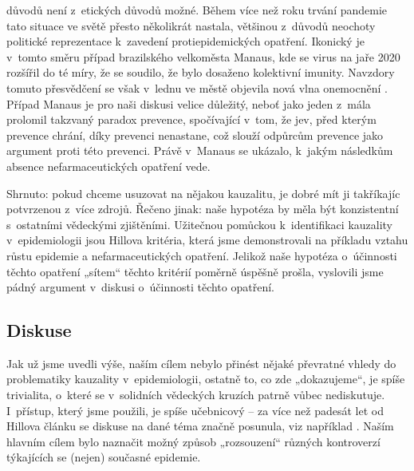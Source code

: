 \begin{enumerate}
důvodů není z~etických důvodů možné. Během více než roku trvání pandemie tato situace
ve světě přesto několikrát nastala, většinou z~důvodů neochoty politické
reprezentace k~zavedení protiepidemických opatření. Ikonický je
v~tomto směru případ brazilského velkoměsta Manaus, kde se virus na
jaře 2020 rozšířil do té míry, že se soudilo, že bylo dosaženo kolektivní
imunity. Navzdory tomuto přesvědčení se však v~lednu ve městě objevila
nová vlna onemocnění \cite{sabino2021resurgence}. 
Případ Manaus je pro naši diskusi velice důležitý, neboť jako jeden z~mála
prolomil takzvaný paradox prevence, spočívající v~tom, že jev, před kterým prevence chrání, díky prevenci nenastane, což slouží odpůrcům prevence jako argument proti této prevenci. Právě v~Manaus se ukázalo, k~jakým následkům absence nefarmaceutických opatření vede.

\end{enumerate}
Shrnuto: pokud chceme usuzovat na nějakou kauzalitu, je dobré mít ji takříkajíc potvrzenou z~více zdrojů. Řečeno jinak: naše hypotéza by měla být konzistentní s~ostatními vědeckými zjištěními. Užitečnou pomůckou k~identifikaci kauzality v~epidemiologii jsou Hillova kritéria, která jsme demonstrovali na příkladu vztahu růstu epidemie a nefarmaceutických opatření. Jelikož naše hypotéza o~účinnosti těchto opatření „sítem“ těchto kritérií poměrně úspěšně prošla, vyslovili jsme pádný argument v~diskusi o~účinnosti těchto opatření.

\subsection*{Diskuse}

Jak už jsme uvedli výše, naším cílem nebylo přinést nějaké převratné
vhledy do problematiky kauzality v~epidemiologii, ostatně to, co zde
„dokazujeme“, je spíše trivialita, o~které se v~solidních vědeckých
kruzích patrně vůbec nediskutuje. I~přístup, který jsme použili, je
spíše učebnicový -- za více než padesát let od Hillova článku se
diskuse na dané téma značně posunula, viz například \cite{rothman2005causation}.
Naším hlavním cílem bylo naznačit možný způsob „rozsouzení“ různých kontroverzí týkajících se (nejen) současné epidemie. 

